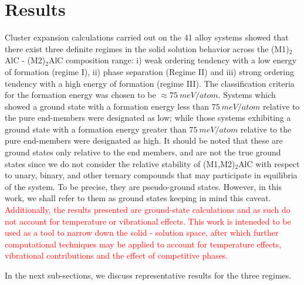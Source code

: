 \documentclass[preprint,amsmath,amssymb,aps, prb,showkeys]{revtex4-1}
\begin{document}
\section{Results}
\label{sec:results} 

Cluster expansion calculations carried out on the 41 alloy systems showed that there exist three definite regimes in the solid solution behavior across the (M1)$_2$AlC - (M2)$_2$AlC composition range: i) weak ordering tendency with a low energy of formation (regime I), ii) phase separation (Regime II) and iii) strong ordering tendency with a high energy of formation (regime III). The classification criteria for the formation energy was chosen to be $\approx 75 ~ meV/atom$. Systems which showed a ground state with a formation energy less than  $75 ~ meV/atom$ relative to the pure end-members were designated as low; while those systems exhibiting a ground state with a formation energy greater than  $75 ~ meV/atom$ relative to the pure end-members were designated as high. It should be noted that these are ground states only relative to the end members, and are not the true ground states since we do not consider the relative stability of (M1,M2)$_2$AlC with respect to unary, binary, and other ternary compounds that 
may participate in equilibria of the system. To be precise, they are pseudo-ground states. However, in this work, we shall refer to them as ground states keeping in mind this caveat. \textcolor{red}{Additionally, the results presented are ground-state calculations and as such do not account for temperature or vibrational effects. This work is inteneded to be used as a tool to narrow down the solid - solution space, after which further computational techniques may be applied to account for temperature effects, vibrational contributions and the effect of competitive phases.}

In the next sub-sections, we discuss representative results for the three regimes. 
\end{document}
